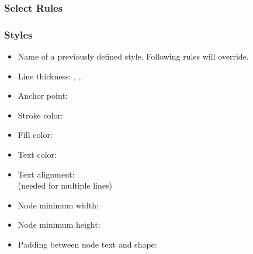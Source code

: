 \subsubsection{Select Rules}
\begin{frame}[fragile]
  \frametitle{Styles }
  \vspace{3mm}
  \begin{itemize}
    \item Name of a previously defined style. Following rules will override.
    \item Line thickness: , , 
    \item Anchor point: 
    \item Stroke color: 
    \item Fill color: 
    \item Text color: 
    \item Text alignment:  \\
          (needed for multiple lines)
    \item Node minimum width: 
    \item Node minimum height: 
    \item Padding between node text and shape: 
  \end{itemize}
\end{frame}

%  

